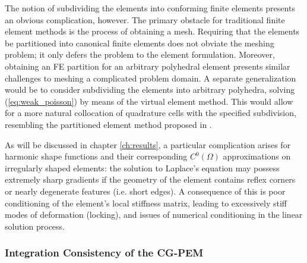 	The notion of subdividing the elements into conforming finite elements presents an obvious complication, however. The primary obstacle for traditional finite element methods is the process of obtaining a mesh. Requiring that the elements be partitioned into canonical finite elements does not obviate the meshing problem; it only defers the problem to the element formulation. Moreover, obtaining an FE partition for an arbitrary polyhedral element presents similar challenges to meshing a complicated problem domain. A separate generalization would be to consider subdividing the elements into arbitrary polyhedra, solving (\ref{eq:weak_poisson}) by means of the virtual element method. This would allow for a more natural collocation of quadrature cells with the specified subdivision, resembling the partitioned element method proposed in \cite{Rashid:12}.
	
	As will be discussed in chapter \ref{ch:results}, a particular complication arises for harmonic shape functions and their corresponding $C^0 (\Omega)$ approximations on irregularly shaped elements: the solution to Laplace's equation may possess extremely sharp gradients if the geometry of the element contains reflex corners or nearly degenerate features (i.e. short edges). A consequence of this is poor conditioning of the element's local stiffness matrix, leading to excessively stiff modes of deformation (locking), and issues of numerical conditioning in the linear solution process.
	
\subsubsection*{Integration Consistency of the CG-PEM}

